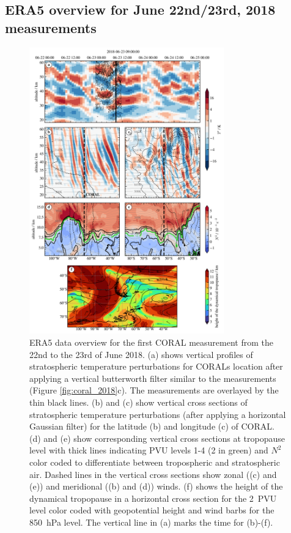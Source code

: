 \subsection*{ERA5 overview for June 22nd/23rd, 2018 measurements}
\begin{figure}[tbp]
    \centering
    \includegraphics[width=0.75\textwidth]{figures_lidar/era5_trop_strat_33.png}
    \caption{ERA5 data overview for the first CORAL measurement from the 22nd to the 23rd of June 2018. (a) shows vertical profiles of stratospheric temperature perturbations for CORALs location after applying a vertical butterworth filter similar to the measurements (Figure \ref{fig:coral_2018}c). The measurements are overlayed by the thin black lines. (b) and (c) show vertical cross sections of stratospheric temperature perturbations (after applying a horizontal Gaussian filter) for the latitude (b) and longitude (c) of CORAL. (d) and (e) show corresponding vertical cross sections at tropopause level with thick lines indicating PVU levels 1-4 (2 in green) and $N^2$ color coded to differentiate between tropospheric and stratospheric air. Dashed lines in the vertical cross sections show zonal ((c) and (e)) and meridional ((b) and (d)) winds. (f) shows the height of the dynamical tropopause in a horizontal cross section for the \SI{2}{PVU} level color coded with geopotential height and wind barbs for the \SI{850}{hPa} level. The vertical line in (a) marks the time for (b)-(f).}
    \label{fig:era5_2018}
\end{figure}
